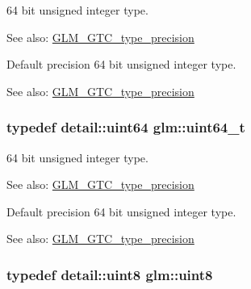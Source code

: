 64 bit unsigned integer type. \begin{Desc}
\item[See also:]\hyperlink{group__gtc__type__precision}{GLM\_\-GTC\_\-type\_\-precision}\end{Desc}
Default precision 64 bit unsigned integer type. \begin{Desc}
\item[See also:]\hyperlink{group__gtc__type__precision}{GLM\_\-GTC\_\-type\_\-precision} \end{Desc}
\hypertarget{group__gtc__type__precision_g058f57c19e1befdcf12498944bd73e69}{
\subsubsection[uint64\_\-t]{\setlength{\rightskip}{0pt plus 5cm}typedef detail::uint64 {\bf glm::uint64\_\-t}}}
\label{group__gtc__type__precision_g058f57c19e1befdcf12498944bd73e69}


64 bit unsigned integer type. \begin{Desc}
\item[See also:]\hyperlink{group__gtc__type__precision}{GLM\_\-GTC\_\-type\_\-precision}\end{Desc}
Default precision 64 bit unsigned integer type. \begin{Desc}
\item[See also:]\hyperlink{group__gtc__type__precision}{GLM\_\-GTC\_\-type\_\-precision} \end{Desc}
\hypertarget{group__gtc__type__precision_g1a7dcd8aac97cc8020817c94049deff2}{
\subsubsection[uint8]{\setlength{\rightskip}{0pt plus 5cm}typedef detail::uint8 {\bf glm::uint8}}}
\label{group__gtc__type__precision_g1a7dcd8aac97cc8020817c94049deff2}


